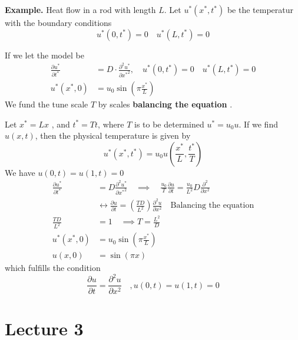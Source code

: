 \documentclass{article}
\theoremstyle{remark}
\begin{document}
\begin{tcolorbox}
  \textbf{Example.} Heat flow in a rod with length $L$. Let $u^{*} \left( x^{*}, t^{*} \right)$ be the temperatur with the boundary conditions \[
  u^{*}\left( 0, t^{*} \right) = 0 \quad  u^{*}\left( L, t^{*} \right) = 0 
  \] 

  If we let the model be \[
    \begin{split}
    \frac{\partial u^{*}}{\partial t^{*}}   & = D \cdot  \frac{\partial ^2 u^{*}}{\partial {x^{*} }^2},  \quad   u^{*}\left( 0, t^{*} \right) = 0 \quad  u^{*}\left( L, t^{*} \right) = 0 \\
 u^{*}\left( x^{*}, 0 \right)   & = u_{0} \sin \left( \pi  \frac{x^{*}}{ L}  \right) 
    \end{split} 
  \] 
  We fund the tune scale $T$ by scales \textbf{balancing the equation} . 
  \par Let $x^{*} = Lx$ , and $t^{*} = Tt$, where $T$ is to be determined $u^{*} = u_{0} u$. If we find $u\left( x,t \right) $,  then the physical temperature is given by \[
    u^{*}\left( x^{*} , t^{*} \right) = u_{0} u\left( \frac{x^{*}}{L} , \frac{t^{*}}{T}  \right)
  \]  
  We have $u\left( 0,t \right) = u\left( 1,t \right) = 0$ \[
    \begin{split}
  \frac{\partial u^{*}}{\partial t^{*}}   & = D \frac{\partial ^2 u^{*}}{\partial {x^{*}}^2}  \quad  \implies  \quad  \frac{u_{0}}{T}  \frac{\partial u}{\partial t}  = \frac{u_{0}}{L^2} D \frac{\partial ^2}{\partial x^2}    \\
    & \leftrightarrow  \frac{\partial u}{\partial  t}   = \left( \frac{T D}{L^2}  \right) \frac{\partial ^2 u}{\partial x ^2}  \quad  \text{Balancing the equation}   \\
      \frac{TD}{ L^2}    & = 1 \quad \implies  T = \frac{L^2}{D}   \\
     u^{*}\left( x^{*}, 0 \right) &=  u_{0} \sin \left( \pi \frac{x^{*}}{L}  \right)  \\
     u\left( x, 0 \right) &=  \sin \left( \pi x \right) 
    \end{split} 
  \] 
  which fulfills the condition \[
  \frac{\partial u}{\partial t}  = \frac{\partial ^2 u}{\partial  x^2}  \quad  , u\left( 0,t \right) = u\left( 1,t \right) = 0 
  \] 
\end{tcolorbox}



\newpage
\section{Lecture 3}%
\label{sec:lecture_something}
\end{document}
